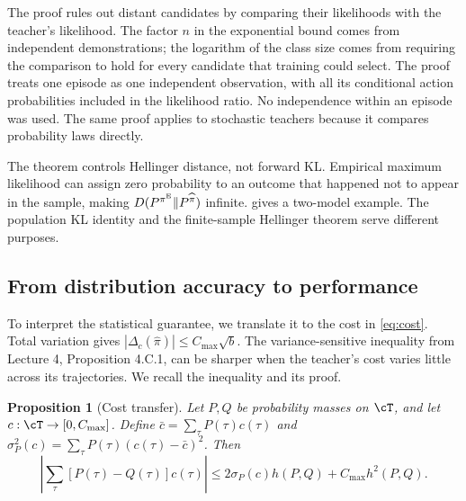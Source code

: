 \documentclass[11pt,twoside]{article}
\newcommand{\KL}{D}
\newtheorem{proposition}[theorem]{Proposition}
\theoremstyle{definition}
\theoremstyle{remark}
\begin{document}
The proof rules out distant candidates by comparing their likelihoods with
the teacher's likelihood. The factor $n$ in the exponential bound comes
from independent demonstrations; the logarithm of the class size comes
from requiring the comparison to hold for every candidate that training
could select.
The proof treats one episode as one independent observation, with all its
conditional action probabilities included in the likelihood ratio. No
independence within an episode was used. The same proof applies to stochastic
teachers because it compares probability laws directly.

The theorem controls Hellinger distance, not forward KL. Empirical maximum
likelihood can assign zero probability to an outcome that happened not to
appear in the sample, making $\KL(P^{\pi^{\rm E}}\Vert P^{\widehat\pi})$
infinite.  gives a two-model example.
The population KL identity and the finite-sample Hellinger theorem serve
different purposes.

\subsection{From distribution accuracy to performance}

To interpret the statistical guarantee, we translate it to the cost in
\cref{eq:cost}. Total variation gives
$|\Delta_c(\widehat\pi)|\le C_{\max}\sqrt b$.
The variance-sensitive inequality from Lecture 4, Proposition 4.C.1,
can be sharper when the teacher's cost varies little across its trajectories.
We recall the inequality and its proof.

\begin{proposition}[Cost transfer]
\label{prop:cost-transfer}
Let $P,Q$ be probability masses on $\cT$, and let
$c:\cT\to[0,C_{\max}]$. Define
$\bar c=\sum_\tau P(\tau)c(\tau)$ and
$\sigma_P^2(c)=\sum_\tau P(\tau)(c(\tau)-\bar c)^2$.
Then
\begin{equation}
 \left|\sum_\tau [P(\tau)-Q(\tau)]c(\tau)\right|
 \le 2\sigma_P(c)h(P,Q)+C_{\max}h^2(P,Q).
 \label{eq:cost-transfer}
\end{equation}
\end{proposition}
\end{document}
